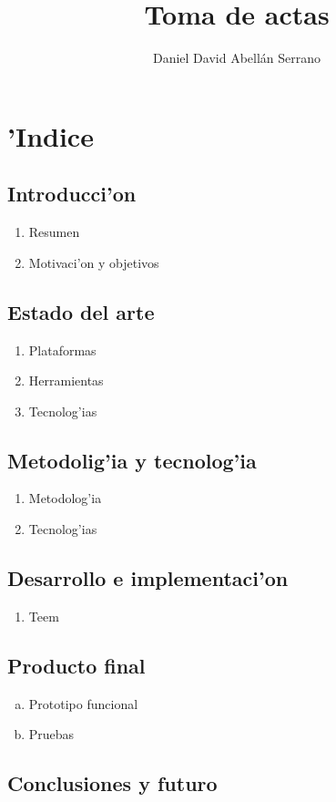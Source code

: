 \documentclass{article}
\title{Toma de actas}
\author{Daniel David Abell\'an Serrano}
\begin{document}
\maketitle
\newpage
\section*{'Indice}
	\subsection{Introducci'on}
		\begin{enumerate}
			\item Resumen
			\item Motivaci'on y objetivos
		\end{enumerate}
	\subsection{Estado del arte}
		\begin{enumerate}
			\item Plataformas
			\item Herramientas
			\item Tecnolog'ias
		\end{enumerate}
	\subsection{Metodolig'ia y tecnolog'ia}
		\begin{enumerate}
			\item Metodolog'ia
			\item Tecnolog'ias
		\end{enumerate}	
	\subsection{Desarrollo e implementaci'on}
		\begin{enumerate}
			\item Teem
		\end{enumerate}	
	\subsection{Producto final}
		\begin{enumerate}[a)]
			\item Prototipo funcional
			\item Pruebas
		\end{enumerate}	
	\subsection{Conclusiones y futuro}
\end{document}
